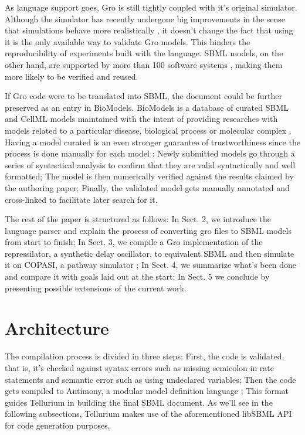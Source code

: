 \documentclass[12pt]{article}
\begin{document}
    As language support goes, Gro is still tightly coupled with it's original simulator. Although the simulator has recently undergone big improvements in the sense that simulations behave more realistically \cite{Gutirrez2017}, it doesn't change the fact that using it is the only available way to validate Gro models. This hinders the reproducibility of experiments built with the language. SBML models, on the other hand, are supported by more than 100 software systems \cite{Hucka2007}, making them more likely to be verified and reused.
    
    If Gro code were to be translated into SBML, the document could be further preserved as an entry in BioModels. BioModels is a database of curated SBML and CellML models maintained with the intent of providing researches with models related to a particular disease, biological process or molecular complex \cite{LeNovere2006}. Having a model curated is an even stronger guarantee of trustworthiness since the process is done manually for each model \cite{LeNovere2006}: Newly submitted models go through a series of syntactical analysis to confirm that they are valid syntactically and well formatted; The model is then numerically verified against the results claimed by the authoring paper; Finally, the validated model gets manually annotated and cross-linked to facilitate later search for it.
    
    The rest of the paper is structured as follows: In Sect. 2, we introduce the language parser and explain the process of converting gro files to SBML models from start to finish; In Sect. 3, we compile a Gro implementation of the repressilator, a synthetic delay oscillator, to equivalent SBML and then simulate it on COPASI, a pathway simulator \cite{Hoops2006}; In Sect. 4, we summarize what's been done and compare it with goals laid out at the start; In Sect. 5 we conclude by presenting possible extensions of the current work.
    

\section{Architecture}

    
    The compilation process is divided in three steps: First, the code is validated, that is, it's checked against syntax errors such as missing semicolon in rate statements and semantic error such as using undeclared variables; Then the code gets compiled to Antimony, a modular model definition language \cite{Smith2009}; This format guides Tellurium in building the final SBML document. As we'll see in the following subsections, Tellurium makes use of the aforementioned libSBML API for code generation purposes.
\end{document}
